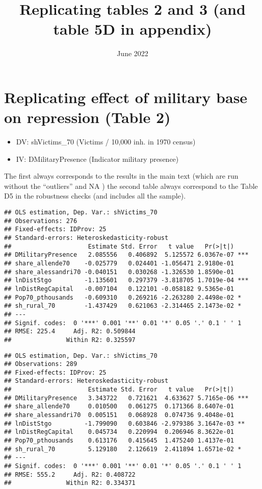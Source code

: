 \documentclass[
]{article}
\title{Replicating tables 2 and 3 (and table 5D in appendix)}
\author{}
\date{\vspace{-2.5em}June 2022}
\providecommand{\tightlist}{%
  \setlength{\itemsep}{0pt}\setlength{\parskip}{0pt}}
\begin{document}
\maketitle

\hypertarget{replicating-effect-of-military-base-on-repression-table-2}{%
\section{Replicating effect of military base on repression (Table
2)}\label{replicating-effect-of-military-base-on-repression-table-2}}

\begin{itemize}
\tightlist
\item
  DV: shVictims\_70 (Victims / 10,000 inh. in 1970 census)
\item
  IV: DMilitaryPresence (Indicator military presence)
\end{itemize}

The first always corresponds to the results in the main text (which are
run without the ``outliers'' and NA ) the second table always correspond
to the Table D5 in the robustness checks (and includes all the sample).

\begin{verbatim}
## OLS estimation, Dep. Var.: shVictims_70
## Observations: 276 
## Fixed-effects: IDProv: 25
## Standard-errors: Heteroskedasticity-robust 
##                     Estimate Std. Error   t value   Pr(>|t|)    
## DMilitaryPresence   2.085556   0.406892  5.125572 6.0367e-07 ***
## share_allende70    -0.025779   0.024401 -1.056471 2.9180e-01    
## share_alessandri70 -0.040151   0.030268 -1.326530 1.8590e-01    
## lnDistStgo         -1.135601   0.297379 -3.818705 1.7019e-04 ***
## lnDistRegCapital   -0.007104   0.122101 -0.058182 9.5365e-01    
## Pop70_pthousands   -0.609310   0.269216 -2.263280 2.4498e-02 *  
## sh_rural_70        -1.437429   0.621063 -2.314465 2.1473e-02 *  
## ---
## Signif. codes:  0 '***' 0.001 '**' 0.01 '*' 0.05 '.' 0.1 ' ' 1
## RMSE: 225.4     Adj. R2: 0.509844
##               Within R2: 0.325597
\end{verbatim}

\begin{verbatim}
## OLS estimation, Dep. Var.: shVictims_70
## Observations: 289 
## Fixed-effects: IDProv: 25
## Standard-errors: Heteroskedasticity-robust 
##                     Estimate Std. Error   t value   Pr(>|t|)    
## DMilitaryPresence   3.343722   0.721621  4.633627 5.7165e-06 ***
## share_allende70     0.010500   0.061275  0.171366 8.6407e-01    
## share_alessandri70  0.005151   0.068928  0.074736 9.4048e-01    
## lnDistStgo         -1.799090   0.603846 -2.979386 3.1647e-03 ** 
## lnDistRegCapital    0.045734   0.220994  0.206946 8.3622e-01    
## Pop70_pthousands    0.613176   0.415645  1.475240 1.4137e-01    
## sh_rural_70         5.129180   2.126619  2.411894 1.6571e-02 *  
## ---
## Signif. codes:  0 '***' 0.001 '**' 0.01 '*' 0.05 '.' 0.1 ' ' 1
## RMSE: 555.2     Adj. R2: 0.408722
##               Within R2: 0.334371
\end{verbatim}
\end{document}
